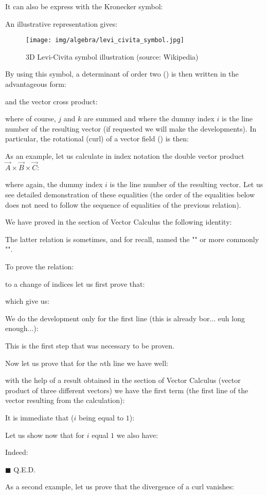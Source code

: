 	It can also be express with the Kronecker symbol:
	
	
	An illustrative representation gives:
	\begin{figure}[H]
		\centering
		\texttt{[image: img/algebra/levi\_civita\_symbol.jpg]}
		\caption[3D Levi-Civita symbol illustration]{3D Levi-Civita symbol illustration (source: Wikipedia)}
	\end{figure}
	By using this symbol, a determinant of order two () is then written in the advantageous form:
	
	and the vector cross product:
	
	where of course, $j$ and $k$ are summed and where the dummy index $i$ is the line number of the resulting vector (if requested we will make the developments). In particular, the rotational (curl) of a vector field () is then:
	   
	As an example, let us calculate in index notation the double vector product $\vec{A}\times\vec{B}\times\vec{C}$:
	 
	where again, the dummy index $i$ is the line number of the resulting vector. Let us see detailed demonstration of these equalities (the order of the equalities below does not need to follow the sequence of equalities of the previous relation).
	\begin{dem}
	We have proved in the section of Vector Calculus the following identity:
	
	\begin{tcolorbox}[title=Remark,colframe=black,arc=10pt]
	The latter relation is sometimes, and for recall, named the "" or more commonly "".
	\end{tcolorbox}	
	To prove the relation:
	
	to a change of indices let us first prove that:
	
	which give us:
	
	We do the development only for the first line (this is already bor... euh long enough...):
	
	This is the first step that was necessary to be proven.
	
	Now let us prove that for the $n$th line we have well:
	
	with the help of a result obtained in the section of Vector Calculus (vector product of three different vectors) we have the first term (the first line of the vector resulting from the calculation):
	
	It is immediate that ($i$ being equal to $1$):
	
	Let us show now that for $i$ equal $1$ we also have:
	
	Indeed:
	
	\begin{flushright}
		$\blacksquare$  Q.E.D.
	\end{flushright}
	\end{dem}
	As a second example, let us prove that the divergence of a curl vanishes:
	
